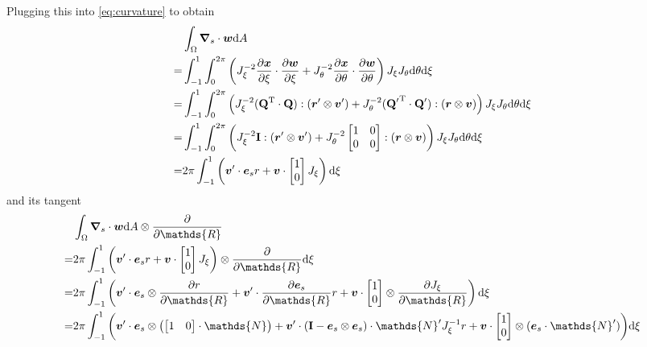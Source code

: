 \documentclass[a4paper,11pt]{article}
\renewcommand{\to}[1]{\text{\boldmath $#1$}} %
\newcommand{\ts}[1]{\text{\boldmath $\mathrm{#1}$}} %
\newcommand{\uv}[1]{\mathds{#1}}
\newcommand{\um}[1]{\mathds{#1}}
\newcommand{\intd}[1]{\mathrm{d}#1}
\newcommand{\pderiv}[2]{\frac{\partial#1}{\partial#2}}
\newcommand{\T}{\mathrm{T}}
\begin{document}
Plugging this into \eqref{eq:curvature} to obtain
\begin{align}
 &\int_\Omega\to \nabla_s\cdot\to w\intd A\\
=&\int_{-1}^{1}\int_0^{2\pi}\left( J_\xi^{-2} \pderiv{\to x}{\xi}\cdot\pderiv{\to w}{\xi} +
                              J_\theta^{-2} \pderiv{\to x}{\theta}\cdot\pderiv{\to w}{\theta}
  \right) J_\xi J_\theta \intd \theta \intd \xi\\
=&\int_{-1}^{1}\int_0^{2\pi}\left(
	  J_\xi^{-2} (\ts Q^\T\cdot\ts Q):(\to r'\otimes \to v') +
	  J_\theta^{-2} ({\ts Q'}^\T\cdot\ts Q'):(\to r\otimes\to v)
  \right) J_\xi J_\theta \intd \theta \intd \xi\\
=&\int_{-1}^{1}\int_0^{2\pi}\left(
	  J_\xi^{-2} \ts I :(\to r'\otimes \to v') +
	  J_\theta^{-2} \begin{bmatrix}1&0\\0&0\end{bmatrix}:(\to r \otimes \to v)
  \right) J_\xi J_\theta \intd \theta \intd \xi\\
=&2\pi\int_{-1}^{1}\left( \to v' \cdot \to e_s r + \to v \cdot \begin{bmatrix}1\\0\end{bmatrix} J_\xi \right) \intd \xi
\end{align}
and its tangent
\begin{align}
 &\int_\Omega\to \nabla_s\cdot\to w\intd A \otimes \pderiv{}{\uv R} \\
 =& 2\pi \int_{-1}^{1} \left(
	\to v' \cdot \to e_s r + \to v\cdot \begin{bmatrix}1\\0\end{bmatrix} J_\xi
	\right)\otimes\pderiv{}{\uv R}\intd\xi\\
  =& 2\pi \int_{-1}^{1} \left(
	\to v' \cdot \to e_s \otimes \pderiv{r}{\uv R} + \to v'\cdot \pderiv{\to e_s}{\uv R} r + \to v\cdot \begin{bmatrix}1\\0\end{bmatrix}\otimes\pderiv{J_\xi}{\uv R}
	\right)\intd\xi\\
  =& 2\pi \int_{-1}^{1} \bigg(
	\to v' \cdot \to e_s \otimes\left(\begin{bmatrix}1&0\end{bmatrix}\cdot \um N\right) +
	\to v'\cdot (\ts I - \to e_s\otimes \to e_s)\cdot \um N' J_\xi^{-1} r
	+\to v\cdot \begin{bmatrix}1\\0\end{bmatrix}\otimes (\to e_s\cdot \um N')
	\bigg)\intd\xi
\end{align}
\end{document}
